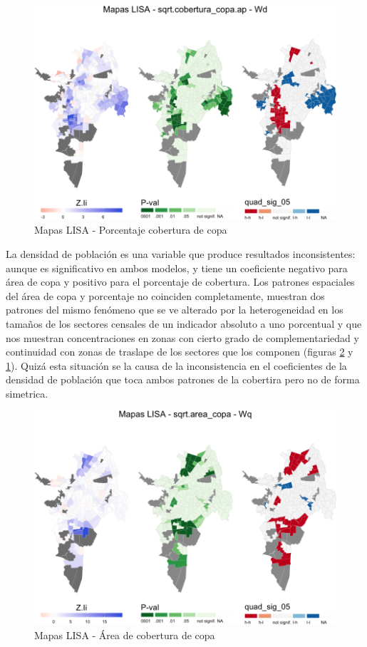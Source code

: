 \documentclass[12pt,]{book}
\begin{document}
\begin{figure}
\includegraphics[width=1\linewidth]{tesis-unigis_files/figure-latex/lisa-copaap-1} \caption{Mapas LISA - Porcentaje cobertura de copa}\label{fig:lisa-copaap}
\end{figure}

La densidad de población es una variable que produce resultados
inconsistentes: aunque es significativo en ambos modelos, y tiene un
coeficiente negativo para área de copa y positivo para el porcentaje de
cobertura. Los patrones espaciales del área de copa y porcentaje no
coinciden completamente, muestran dos patrones del mismo fenómeno que se
ve alterado por la heterogeneidad en los tamaños de los sectores
censales de un indicador absoluto a uno porcentual y que nos muestran
concentraciones en zonas con cierto grado de complementariedad y
continuidad con zonas de traslape de los sectores que los componen
(figuras \ref{fig:lisa-copa} y \ref{fig:lisa-copaap}). Quizá esta
situación se la causa de la inconsistencia en el coeficientes de la
densidad de población que toca ambos patrones de la cobertira pero no de
forma simetrica.

\begin{figure}
\includegraphics[width=1\linewidth]{tesis-unigis_files/figure-latex/lisa-copa-1} \caption{Mapas LISA - Área de cobertura de copa}\label{fig:lisa-copa}
\end{figure}
\end{document}
